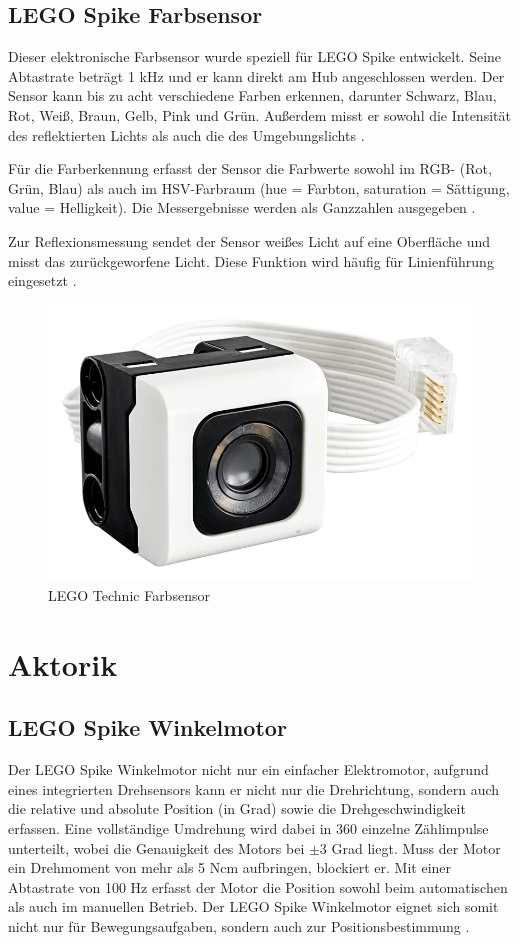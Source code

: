 \subsection{LEGO Spike Farbsensor}
Dieser elektronische Farbsensor wurde speziell für LEGO Spike entwickelt. Seine Abtastrate beträgt 1 kHz und er kann direkt am Hub angeschlossen werden. Der Sensor kann bis zu acht verschiedene Farben erkennen, darunter Schwarz, Blau, Rot, Weiß, Braun, Gelb, Pink und Grün. Außerdem misst er sowohl die Intensität des reflektierten Lichts als auch die des Umgebungslichts \autocite{lego2020colorsensor}\autocite{legoeducation2020spikesensors}.

Für die Farberkennung erfasst der Sensor die Farbwerte sowohl im RGB- (Rot, Grün, Blau) als auch im HSV-Farbraum (hue = Farbton, saturation = Sättigung, value = Helligkeit). Die Messergebnisse werden als Ganzzahlen ausgegeben \autocite{lego2020colorsensor}.

Zur Reflexionsmessung sendet der Sensor weißes Licht auf eine Oberfläche und misst das zurückgeworfene Licht. Diese Funktion wird häufig für Linienführung eingesetzt \autocite{betzold2025colorsensor}\autocite{lego2020colorsensor}.

\begin{figure}[H]
	\centering
	\includegraphics[width=0.4\linewidth]{images/Farbsensor}
	\caption[LEGO Technic Farbsensor Quelle:\autocite{legoeducation2020spikesensors}]{LEGO Technic Farbsensor}
	\label{fig:farbsensor}
\end{figure}

\section{Aktorik} %
\subsection{LEGO Spike Winkelmotor}
Der LEGO Spike Winkelmotor nicht nur ein einfacher Elektromotor, aufgrund eines integrierten Drehsensors kann er nicht nur die Drehrichtung, sondern auch die relative und absolute Position (in Grad) sowie die Drehgeschwindigkeit erfassen. Eine vollständige Umdrehung wird dabei in 360 einzelne Zählimpulse unterteilt, wobei die Genauigkeit des Motors bei $\pm3$ Grad liegt. Muss der Motor ein Drehmoment von mehr als 5 Ncm aufbringen, blockiert er. Mit einer Abtastrate von 100 Hz erfasst der Motor die Position sowohl beim automatischen als auch im manuellen Betrieb. Der LEGO Spike Winkelmotor eignet sich somit nicht nur für Bewegungsaufgaben, sondern auch zur Positionsbestimmung \autocite{legoeducation2020spikesensors}.

